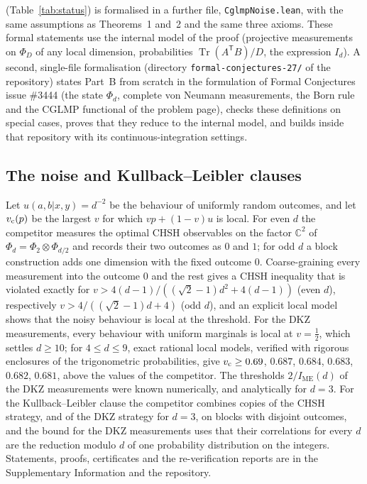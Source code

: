 \documentclass[11pt]{article}
\newcommand{\Tr}{\operatorname{Tr}}
\newcommand{\C}{\mathbb{C}}
\newcommand{\IME}{I_{\mathrm{ME}}}
\begin{document}
(Table~\ref{tab:status}) is formalised in a further file, \texttt{CglmpNoise.lean}, with the same assumptions as
Theorems~1 and~2 and the same three axioms. These formal statements use the internal model of the proof (projective
measurements on $\Phi_D$ of any local dimension, probabilities $\Tr(A^{\mathsf T}B)/D$, the expression $I_d$). A second,
single-file formalisation (directory \texttt{formal-conjectures-27/} of the repository) states Part~B from scratch in
the formulation of Formal Conjectures issue \#3444 (the state $\Phi_d$, complete von Neumann measurements, the Born rule
and the CGLMP functional of the problem page), checks these definitions on special cases, proves that they reduce to the
internal model, and builds inside that repository with its continuous-integration settings.

\subsection*{The noise and Kullback--Leibler clauses}
Let $u(a,b|x,y)=d^{-2}$ be the behaviour of uniformly random outcomes, and let $v_{\rm c}(p)$ be the largest $v$ for
which $vp+(1-v)u$ is local. For even $d$ the competitor measures the optimal CHSH observables on the factor $\C^2$ of
$\Phi_d=\Phi_2\otimes\Phi_{d/2}$ and records their two outcomes as $0$ and $1$; for odd $d$ a block construction adds
one dimension with the fixed outcome $0$. Coarse-graining every measurement into the outcome $0$ and the rest gives a
CHSH inequality that is violated exactly for $v>4(d-1)/((\sqrt2-1)d^2+4(d-1))$ (even $d$), respectively
$v>4/((\sqrt2-1)d+4)$ (odd $d$), and an explicit local model shows that the noisy behaviour is local at the threshold.
For the DKZ measurements, every behaviour with uniform marginals is local at $v=\frac12$, which settles $d\ge10$; for
$4\le d\le9$, exact rational local models, verified with rigorous enclosures of the trigonometric probabilities, give
$v_{\rm c}\ge0.69$, $0.687$, $0.684$, $0.683$, $0.682$, $0.681$, above the values of the competitor. The thresholds
$2/\IME(d)$ of the DKZ measurements were known numerically\cite{KGZMZ2000,DKZ2001,CGLMP2002,GLZ2012}, and analytically
for $d=3$\cite{Chen2001}. For the Kullback--Leibler clause the competitor combines copies of the CHSH strategy, and of
the DKZ strategy for $d=3$, on blocks with disjoint outcomes, and the bound for the DKZ measurements uses that their
correlations for every $d$ are the reduction modulo $d$ of one probability distribution on the integers. Statements,
proofs, certificates and the re-verification reports are in the Supplementary Information and the
repository\cite{repoOQP27}.
\end{document}

